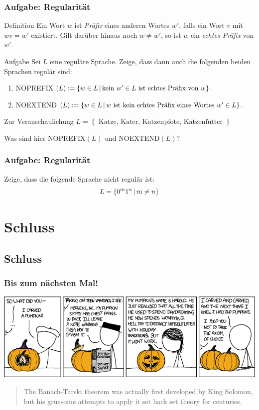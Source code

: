 \begin{frame}
\frametitle{Aufgabe: Regularität}

\begin{block}{Definition}
Ein Wort $w$ ist \emph{Präfix} eines anderen Wortes
$w'$, falls ein Wort $v$ mit $wv = w'$ existiert. Gilt darüber hinaus
noch $w\neq w'$, so ist $w$ ein \emph{echtes Präfix} von $w'$.
\end{block}

\pause

\begin{block}{Aufgabe}
Sei $L$ eine reguläre Sprache. Zeige, dass dann auch die folgenden beiden Sprachen regulär sind:
\begin{enumerate}
\item NOPREFIX$(L):=\left\lbrace w\in L \,\middle\vert\, \mbox{kein $w'\in L$ ist echtes Präfix
    von $w$} \right\rbrace.$
\item NOEXTEND$(L):= \left\lbrace w\in L \,\middle\vert\, \mbox{$w$ ist kein echtes Präfix eines
    Wortes $w'\in L$} \right\rbrace.$
\end{enumerate}
\end{block}

\pause

\begin{block}{Zur Veranschaulichung}
$ L = \left\lbrace \text{ Katze, Kater, Katzenpfote, Katzenfutter } \right\rbrace $

Was sind hier NOPREFIX$(L)$ und NOEXTEND$(L)$?
\end{block}

\end{frame}
\begin{frame}
 \frametitle{Aufgabe: Regularität}
 Zeige, dass die folgende Sprache nicht regulär ist:
 $$L = \left\lbrace 0^m 1^n \,\middle\vert\, m \neq n \right\rbrace$$
\end{frame}

\section{Schluss}
\subsection{Schluss}

\begin{frame}
 \frametitle{Bis zum nächsten Mal!}
 \begin{center} \includegraphics[width=\textwidth]{images/xkcd_804.png} \end{center}
 \begin{quote}\scriptsize{The Banach-Tarski theorem was actually first developed by King Solomon, but his gruesome attempts to apply it set back set theory for centuries.}\end{quote}
\end{frame}


